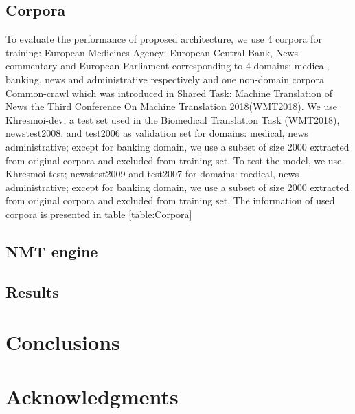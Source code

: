 \documentclass[11pt,a4paper]{article}
\begin{document}
\subsection{Corpora}
To evaluate the performance of proposed architecture, we use 4 corpora for training: European Medicines Agency; European Central Bank, News-commentary and European Parliament \cite{Tiedemann2009RANLP5} corresponding to 4 domains: medical, banking, news and administrative  respectively and one non-domain corpora Common-crawl  which was introduced in Shared Task: Machine Translation of News the Third Conference On Machine Translation 2018(WMT2018). We use Khresmoi-dev, a test set used in the Biomedical Translation Task (WMT2018), newstest2008, and test2006 as validation set for domains: medical, news administrative; except for banking domain, we use a subset of size 2000 extracted from original corpora and excluded from training set. To test the model, we use Khresmoi-test; newstest2009 and test2007 for domains: medical, news administrative; except for banking domain, we use a subset of size 2000 extracted from original corpora and excluded from training set. The information of used corpora is presented in table \ref{table:Corpora}
\begin{table}[H]
\caption{Corpora}
\label{table:Corpora}
\end{table}

\subsection{NMT engine}

\subsection{Results}

\section{Conclusions}

\section*{Acknowledgments}



\end{document}
